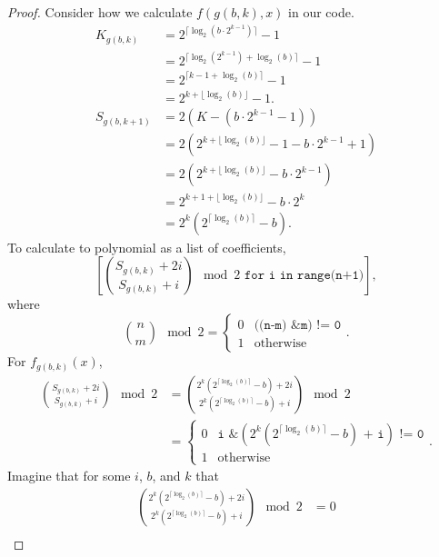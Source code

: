 \documentclass[a4paper]{article}
\begin{document}
	\begin{proof}
		Consider how we calculate $f(g(b,k),x)$ in our code.
		\begin{align*}
			K_{g(b,k)} &= 2^{\lceil \log_2{\left(b\cdot2^{k-1}\right)} \rceil} - 1 \\
				&= 2^{\lceil \log_2{\left(2^{k-1}\right)}+ \log_2{(b)} \rceil} - 1 \\
				&= 2^{\lceil k-1 + \log_2{(b)} \rceil} - 1 \\
				&= 2^{k + \lfloor \log_2{(b)} \rfloor} - 1. \\
			S_{g(b,k+1)} &= 2\left(K - \left(b\cdot2^{k-1} - 1\right)\right) \\
				&= 2\left(2^{k + \lfloor \log_2{(b)} \rfloor} - 1 - b\cdot2^{k-1}+1\right) \\
				&= 2\left(2^{k + \lfloor \log_2{(b)} \rfloor} - b\cdot2^{k-1}\right) \\
				&= 2^{k+1+\lfloor\log_2{(b)}\rfloor} - b\cdot2^{k} \\
				&= 2^{k}\left(2^{\lceil \log_2{(b)}\rceil} - b\right).
		\end{align*}
		To calculate to polynomial as a list of coefficients,
		\begin{equation*}
			\left[\binom{S_{g(b,k)} + 2i}{S_{g(b,k)} + i} \mod 2 \texttt{ for i in range(n+1)} \right],
		\end{equation*}
		where
		\begin{equation*}
			\binom{n}{m} \mod 2 = \begin{cases}
				0 & \texttt{((n-m) \& m) != 0} \\
				1 & \text{otherwise}
			\end{cases}.
		\end{equation*}
		For $f_{g(b,k)}(x)$,
		\begin{align*}
			\binom{S_{g(b,k)}+2i}{S_{g(b,k)}+i} \mod 2 &= \binom{2^{k}\left(2^{\lceil \log_2{(b)}\rceil} - b\right) + 2i}{2^{k}\left(2^{\lceil \log_2{(b)}\rceil} - b\right) + i} \mod 2 \\
			&= \begin{cases}
				0 & \texttt{i \& }\left(2^{k}\left(2^{\lceil \log_2{(b)}\rceil} - b\right) \texttt{ + i}\right)\texttt{ != 0} \\
				1 & \text{otherwise}
			\end{cases}.
		\end{align*}
		Imagine that for some $i$, $b$, and $k$ that
		\begin{align*}
			\binom{2^{k}\left(2^{\lceil \log_2{(b)}\rceil} - b\right) + 2i}{2^{k}\left(2^{\lceil \log_2{(b)}\rceil} - b\right) + i} \mod 2 &= 0 \\

\end{align*}
\end{proof}
\end{document}
